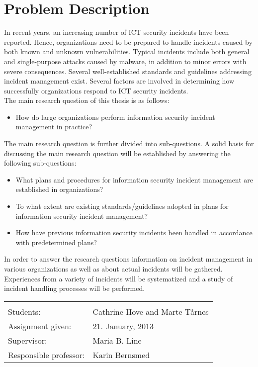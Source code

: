 \documentclass[b5paper, twoside, openright, 11pt]{report}
\begin{document}
\chapter*{Problem Description}
\vspace{-0.2cm}
In recent years, an increasing number of ICT security incidents have been reported. Hence, organizations need to be prepared to handle incidents caused by both known and unknown vulnerabilities. Typical incidents include both general and single-purpose attacks caused by malware, in addition to minor errors with severe consequences. Several well-established standards and guidelines addressing incident management exist. Several factors are involved in determining how successfully organizations respond to ICT security incidents. \\

The main research question of this thesis is as follows: 
\begin{itemize}
\item How do large organizations perform information security incident management in practice?
\end{itemize}

The main research question is further divided into sub-questions. A solid basis for discussing the main research question will be established by answering the following sub-questions:\\

\begin{itemize}\itemsep-0.1cm
\item What plans and procedures for information security incident management are established in organizations?
\item To what extent are existing standards/guidelines adopted in plans for information security incident management?
\item How have previous information security incidents been handled in accordance with predetermined plans? 
\end{itemize}

In order to answer the research questions information on incident management in various organizations as well as about actual incidents will be gathered. Experiences from a variety of incidents will be systematized and a study of incident handling processes will be performed.


\begin{tabular}{@{}p{4cm}l}
\vspace{0.1cm} & \vspace{0.1cm} \\
Students:		& Cathrine Hove and Marte T\aa rnes \\
Assignment given: & 21. January, 2013 \\
Supervisor:		& Maria B. Line \\
Responsible professor: 	& Karin Bernsmed 
\end{tabular}
\end{document}

